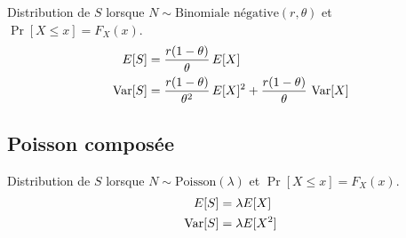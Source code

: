 Distribution de $S$ lorsque $N \sim \text{Binomiale négative}(r,
\theta)$ et $\Pr[X \leq x] = F_X(x)$.
\begin{align*}
  E [ S ] &= \frac{r(1 - \theta)}{\theta}\, E [ X ] \\
  \operatorname{Var} [ S ] &= \frac{r(1 - \theta)}{\theta^2}\, E [ X ]^2 + \frac{r(1 -
    \theta)}{\theta}\, \operatorname{Var} [ X ]
\end{align*}

\subsection{Poisson composée}
\label{sec:distributions:poissoncomposée}

Distribution de $S$ lorsque $N \sim \text{Poisson}(\lambda)$ et $\Pr[X
\leq x] = F_X(x)$.
\begin{align*}
  E [ S ] &= \lambda E [ X ] \\
  \operatorname{Var} [ S ] &= \lambda E [ X^2 ]
\end{align*}

\endgroup

